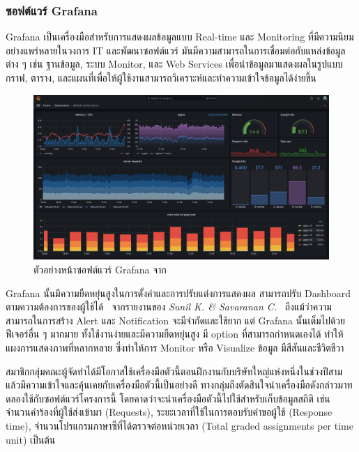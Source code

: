 \documentclass[12pt,one side,openright,a4paper]{cpe-thesis-th}
\newcommand{\thaijustify}[1]{%
  \par\hspace{30pt}\justifying
  #1
}
\begin{document}
        \subsubsection{ซอฟต์แวร์ Grafana}
            \thaijustify{
                Grafana เป็นเครื่องมือสำหรับการแสดงผลข้อมูลแบบ Real-time และ Monitoring ที่มีความนิยมอย่างแพร่หลายในวงการ IT และพัฒนาซอฟต์แวร์ มันมีความสามารถในการเชื่อมต่อกับแหล่งข้อมูลต่าง ๆ เช่น ฐานข้อมูล, ระบบ Monitor, และ Web Services เพื่อนำข้อมูลมาแสดงผลในรูปแบบกราฟ, ตาราง, และแผนที่เพื่อให้ผู้ใช้งานสามารถวิเคราะห์และทำความเข้าใจข้อมูลได้ง่ายขึ้น~\cite{grafana}
            }
            \begin{figure}[H]
                \centering
                    \includegraphics[width=12cm]{figure/literature/grafana.png}
                \caption[ตัวอย่างหน้าซอฟต์แวร์ Grafana]{ตัวอย่างหน้าซอฟต์แวร์ Grafana จาก~\cite{grafanaoss}}
                \label{fig:lit-grafana}
            \end{figure}
            \thaijustify{
                Grafana นั้นมีความยืดหยุ่นสูงในการตั้งค่าและการปรับแต่งการแสดงผล สามารถปรับ Dashboard ตามความต้องการของผู้ใช้ได้~\cite{grafana, grafanaoss} จากรายงานของ \textit{Sunil K. \& Savaranan C.}~\cite{sunil21grafana} ถึงแม้ว่าความสามารถในการสร้าง Alert และ Notification จะมีจำกัดและใช้ยาก แต่ Grafana นั้นเต็มไปด้วยฟีเจอร์อื่น ๆ มากมาย ทั้งใช้งานง่ายและมีความยืดหยุ่นสูง มี option ที่สามารถกำหนดเองได้ ทำให้แผงการแสดงภาพที่หลากหลาย ซึ่งทำให้การ Monitor หรือ Visualize ข้อมูล มีสีสันและชีวิตชีวา
            }
            \thaijustify{
                สมาชิกกลุ่มคณะผู้จัดทำได้มีโอกาสใช้เครื่องมือตัวนี้ตอนฝึกงานกับบริษัทใหญ่แห่งหนึ่งในช่วงปีสาม แล้วมีความเข้าใจและคุ้นเคยกับเครื่องมือตัวนี้เป็นอย่างดี ทางกลุ่มถึงตัดสินใจนำเครื่องมือดังกล่าวมาทดลองใช้กับซอฟต์แวร์โครงการนี้ โดยคาดว่าจะนำเครื่องมือตัวนี้ไปใช้สำหรับเก็บข้อมูลสถิติ เช่น จำนวนคำร้องที่ผู้ใช้ส่งเข้ามา (Requests), ระยะเวลาที่ใช้ในการตอบรับคำขอผู้ใช้ (Response time), จำนวนโปรแกรมภาษาซีที่ได้ตรวจต่อหน่วยเวลา (Total graded assignments per time unit) เป็นต้น 
            }
\end{document}
